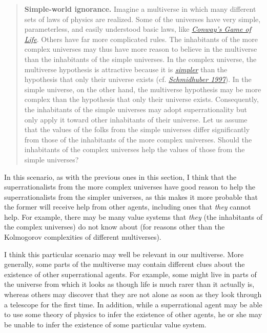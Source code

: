 \begin{quote}
\textbf{Simple-world ignorance.} Imagine a multiverse in which many
different sets of laws of physics are realized. Some of the universes
have very simple, parameterless, and easily understood basic laws, like
\href{https://en.wikipedia.org/wiki/Conway\%27s_Game_of_Life}{\emph{Conway's
Game of Life}}. Others have far more complicated rules. The inhabitants
of the more complex universes may thus have more reason to believe in
the multiverse than the inhabitants of the simple universes. In the
complex universe, the multiverse hypothesis is attractive because it is
\href{http://lesswrong.com/lw/jp/occams_razor/}{\emph{simpler}} than the
hypothesis that only their universe exists (cf.
\href{ftp://ftp.idsia.ch/pub/juergen/everything.pdf}{\emph{Schmidhuber
1997}}). In the simple universe, on the other hand, the multiverse
hypothesis may be more complex than the hypothesis that only their
universe exists. Consequently, the inhabitants of the simple universes
may adopt superrationality but only apply it toward other inhabitants of
their universe. Let us assume that the values of the folks from the
simple universes differ significantly from those of the inhabitants of
the more complex universes. Should the inhabitants of the complex
universes help the values of those from the simple universes?
\end{quote}

In this scenario, as with the previous ones in this section, I think
that the superrationalists from the more complex universes have good
reason to help the superrationalists from the simpler universes, as this
makes it more probable that the former will receive help from other
agents, including ones that \emph{they} cannot help. For example, there
may be many value systems that \emph{they} (the inhabitants of the
complex universes) do not know about (for reasons other than the
Kolmogorov complexities of different multiverses).

I think this particular scenario may well be relevant in our multiverse.
More generally, some parts of the multiverse may contain different clues
about the existence of other superrational agents. For example, some
might live in parts of the universe from which it looks as though life
is much rarer than it actually is, whereas others may discover that they
are not alone as soon as they look through a telescope for the first
time. In addition, while a superrational agent may be able to use some
theory of physics to infer the existence of other agents, he or she may
be unable to infer the existence of some particular value system.

